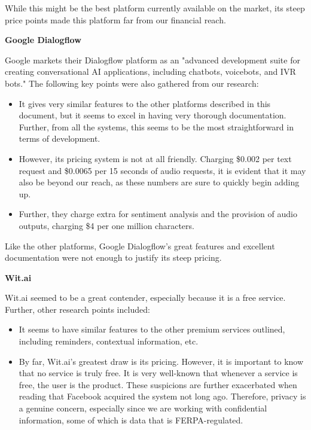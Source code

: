 \documentclass[titlepage, 12pt]{article}
\begin{document}
While this might be the best platform currently available on the market, its steep price points made this platform far from our financial reach.

\textbf{Google Dialogflow}

Google markets their Dialogflow platform as an "advanced development suite for creating conversational AI applications, including chatbots, voicebots, and IVR bots." The following key points were also gathered from our research:

\begin{itemize}
    \item It gives very similar features to the other platforms described in this document, but it seems to excel in having very thorough documentation. Further, from all the systems, this seems to be the most straightforward in terms of development.
    \item However, its pricing system is not at all friendly. Charging \$0.002 per text request and \$0.0065 per 15 seconds of audio requests, it is evident that it may also be beyond our reach, as these numbers are sure to quickly begin adding up. 
    \item Further, they charge extra for sentiment analysis and the provision of audio outputs, charging \$4 per one million characters.
\end{itemize}

Like the other platforms, Google Dialogflow's great features and excellent documentation were not enough to justify its steep pricing.

\textbf{Wit.ai}

Wit.ai seemed to be a great contender, especially because it is a free service. Further, other research points included:

\begin{itemize}
    \item It seems to have similar features to the other premium services outlined, including reminders, contextual information, etc.
    \item By far, Wit.ai's greatest draw is its pricing. However, it is important to know that no service is truly free. It is very well-known that whenever a service is free, the user is the product. These suspicions are further exacerbated when reading that Facebook acquired the system not long ago. Therefore, privacy is a genuine concern, especially since we are working with confidential information, some of which is data that is FERPA-regulated.
\end{itemize}
\end{document}
